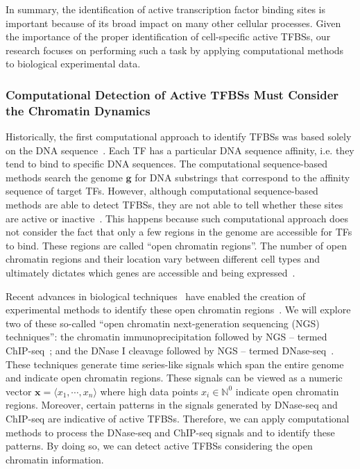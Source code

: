 In summary, the identification of active transcription factor binding sites is important because of its broad impact on many other cellular processes. Given the importance of the proper identification of cell-specific active TFBSs, our research focuses on performing such a task by applying computational methods to biological experimental data.

\subsubsection{Computational Detection of Active TFBSs Must Consider the Chromatin Dynamics}

Historically, the first computational approach to identify TFBSs was based solely on the DNA sequence~\citep{stormo2000}. Each TF has a particular DNA sequence affinity, i.e. they tend to bind to specific DNA sequences. The computational sequence-based methods search the genome $\mathbf{g}$ for DNA substrings that correspond to the affinity sequence of target TFs. However, although computational sequence-based methods are able to detect TFBSs, they are not able to tell whether these sites are active or inactive~\citep{pique2011}. This happens because such computational approach does not consider the fact that only a few regions in the genome are accessible for TFs to bind. These regions are called ``open chromatin regions''. The number of open chromatin regions and their location vary between different cell types and ultimately dictates which genes are accessible and being expressed~\citep{encode2012}.

Recent advances in biological techniques~\citep{shendure2008} have enabled the creation of experimental methods to identify these open chromatin regions~\citep{encode2012}. We will explore two of these so-called ``open chromatin next-generation sequencing (NGS) techniques'': the chromatin immunoprecipitation followed by NGS -- termed ChIP-seq~\citep{johnson2007}; and the DNase I cleavage followed by NGS -- termed DNase-seq~\citep{crawford2004,sabo2004a}. These techniques generate time series-like signals which span the entire genome and indicate open chromatin regions. These signals can be viewed as a numeric vector $\mathbf{x} = \langle x_1, \cdots, x_n \rangle$ where high data points $x_i \in {\mathbb{N}}^{0}$ indicate open chromatin regions. Moreover, certain patterns in the signals generated by DNase-seq and ChIP-seq are indicative of active TFBSs. Therefore, we can apply computational methods to process the DNase-seq and ChIP-seq signals and to identify these patterns. By doing so, we can detect active TFBSs considering the open chromatin information.

